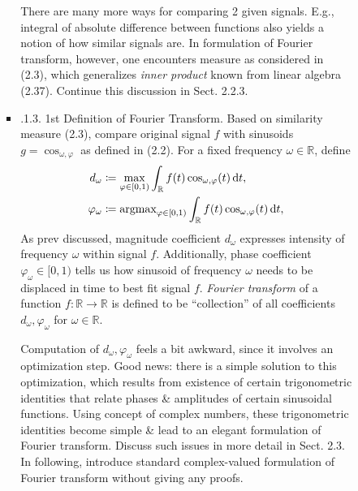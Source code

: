 \documentclass{article}
\begin{document}
\begin{itemize}
\begin{itemize}
\begin{itemize}
\begin{itemize}
				There are many more ways for comparing 2 given signals. E.g., integral of absolute difference between functions also yields a notion of how similar signals are. In formulation of Fourier transform, however, one encounters measure as considered in (2.3), which generalizes {\it inner product} known from linear algebra (2.37). Continue this discussion in Sect. 2.2.3.
				\item {.1.3. 1st Definition of Fourier Transform.} Based on similarity measure (2.3), compare original signal $f$ with sinusoids $g = \cos_{\omega,\varphi}$ as defined in (2.2). For a fixed frequency $\omega\in\mathbb{R}$, define
				\begin{align*}
					d_\omega&\coloneqq\max_{\varphi\in[0,1)} \int_\mathbb{R} f(t)\cos_{\omega,\varphi}(t)\,{\rm d}t,\\
					\varphi_\omega&\coloneqq\operatorname{argmax}_{\varphi\in[0,1)} \int_\mathbb{R} f(t)\cos_{\omega,\varphi}(t)\,{\rm d}t,\\
				\end{align*}
				As prev discussed, magnitude coefficient $d_\omega$ expresses intensity of frequency $\omega$ within signal $f$. Additionally, phase coefficient $\varphi_\omega\in[0,1)$ tells us how sinusoid of frequency $\omega$ needs to be displaced in time to best fit signal $f$. {\it Fourier transform} of a function $f:\mathbb{R}\to\mathbb{R}$ is defined to be ``collection'' of all coefficients $d_\omega,\varphi_\omega$ for $\omega\in\mathbb{R}$.
				
				Computation of $d_\omega,\varphi_\omega$ feels a bit awkward, since it involves an optimization step. Good news: there is a simple solution to this optimization, which results from existence of certain trigonometric identities that relate phases \& amplitudes of certain sinusoidal functions. Using concept of complex numbers, these trigonometric identities become simple \& lead to an elegant formulation of Fourier transform. Discuss such issues in more detail in Sect. 2.3. In following, introduce standard complex-valued formulation of Fourier transform without giving any proofs.
				

\end{itemize}
\end{itemize}
\end{itemize}
\end{itemize}
\end{document}
